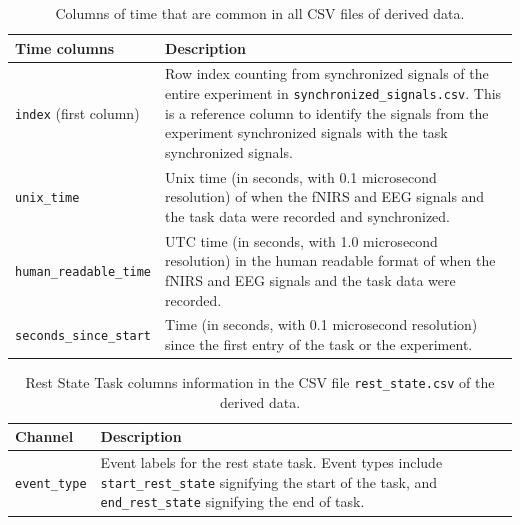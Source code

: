 \begin{table}[h]
    \centering
    \begin{tabularx}{\textwidth}{lX}
        \toprule
        Time columns & Description \\
        \midrule
        \texttt{index} (first column) & Row index counting from synchronized signals of the entire experiment in \texttt{synchronized\_signals.csv}. This is a reference column to identify the signals from the experiment synchronized signals with the task synchronized signals.\\
        \texttt{unix\_time} & Unix time (in seconds, with 0.1 microsecond resolution) of when the fNIRS and EEG signals and the task data were recorded and synchronized.\\
        \texttt{human\_readable\_time} & UTC time (in seconds, with 1.0 microsecond resolution) in the human readable format of when the fNIRS and EEG signals and the task data were recorded.\\
        \texttt{seconds\_since\_start} & Time (in seconds, with 0.1 microsecond resolution) since the first entry of the task or the experiment.\\
        \bottomrule
    \end{tabularx}
    \caption{Columns of time that are common in all CSV files of derived data.}
    \label{tab:shared_columns}
\end{table}

\begin{table}[h]
\centering
\begin{tabularx}{\textwidth}{lX}
    \toprule
Channel & Description \\
\midrule
\texttt{event\_type} & Event labels for the rest state task. Event types include \texttt{start\_rest\_state} signifying the start of the task, and \texttt{end\_rest\_state} signifying the end of task.\\
\bottomrule
\end{tabularx}
\caption{Rest State Task columns information in the CSV file \texttt{rest\_state.csv} of the derived data.}
\label{tab:rest_task_columns}
\end{table}

